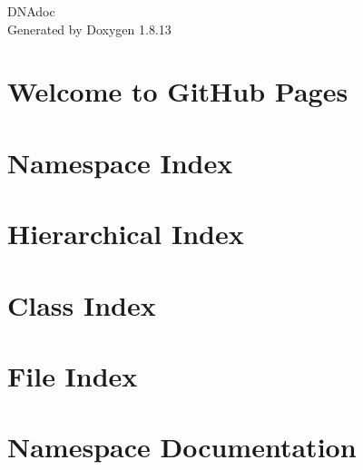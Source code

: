 \documentclass[twoside]{book}
\newcommand{\+}{\discretionary{\mbox{\scriptsize$\hookleftarrow$}}{}{}}
\newcommand{\clearemptydoublepage}{%
  \newpage{\pagestyle{empty}\cleardoublepage}%
}
\begin{document}
\hypersetup{pageanchor=false,
             bookmarksnumbered=true,
             pdfencoding=unicode
            }
\begin{titlepage}
\vspace*{7cm}
\begin{center}%
{\Large D\+N\+Adoc }\\
\vspace*{1cm}
{\large Generated by Doxygen 1.8.13}\\
\end{center}
\end{titlepage}
\clearemptydoublepage
{}
\tableofcontents
\clearemptydoublepage
{}
\hypersetup{pageanchor=true}

\chapter{Welcome to Git\+Hub Pages}
\label{md__c_1__users_lowxorx__source__repos_c-projet-adn__r_e_a_d_m_e}

\chapter{Namespace Index}

\chapter{Hierarchical Index}

\chapter{Class Index}

\chapter{File Index}

\chapter{Namespace Documentation}



























\end{document}
